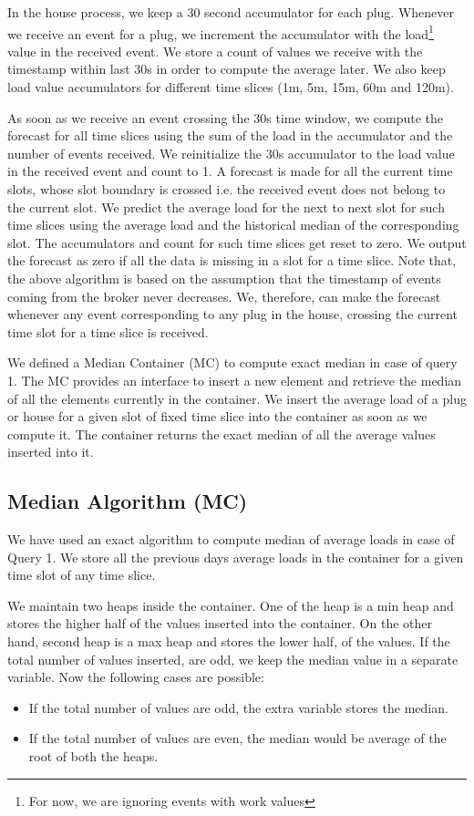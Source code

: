 In the house process, we keep a 30 second accumulator for each plug.
Whenever we receive an event for a plug, we increment the accumulator with the load\footnote{For now, we are ignoring events with work values} value in the received event.
We store a count of values we receive with the timestamp within last 30s in order to compute the average later.
We also keep load value accumulators for different time slices (1m, 5m, 15m, 60m and 120m).


As soon as we receive an event crossing the 30s time window, we compute the forecast for all time slices using the sum of the load in the accumulator and the number of events received.
We reinitialize the 30s accumulator to the load value in the received event and count to 1.
A forecast is made for all the current time slots, whose slot boundary is crossed i.e.
the received event does not belong to the current slot.
We predict the average load for the next to next slot for such time slices using the average load and the historical median of the corresponding slot.
The accumulators and count for such time slices get reset to zero.
We output the forecast as zero if all the data is missing in a slot for a time slice.
Note that, the above algorithm is based on the assumption that the timestamp of events coming from the broker never decreases.
We, therefore, can make the forecast whenever any event corresponding to any plug in the house, crossing the current time slot for a time slice is received.

We defined a Median Container (MC) to compute exact median in case of query 1.
The MC provides an interface to insert a new element and retrieve the median of all the elements currently in the container.
We insert the average load of a plug or house for a given slot of fixed time slice into the container as soon as we compute it.
The container returns the exact median of all the average values inserted into it.

\subsection{Median Algorithm (MC)}
We have used an exact algorithm to compute median of average loads in case of Query 1.
We store all the previous days average loads in the container for a given time slot of any time slice.

We maintain two heaps inside the container.
One of the heap is a min heap and stores the higher half of the values inserted into the container.
On the other hand, second heap is a max heap and stores the lower half, of the values.
If the total number of values inserted, are odd, we keep the median value in a separate variable.
Now the following cases are possible:
\begin{itemize}
\item If the total number of values are odd, the extra variable stores the median.
\item If the total number of values are even, the median would be average of the root of both the heaps.
\end{itemize}

